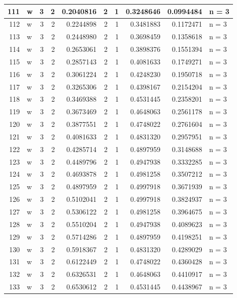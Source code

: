 \documentclass[
  letterpaper,
  DIV=11,
  numbers=noendperiod]{scrreprt}
\begin{document}
\begin{table}
\begin{tabular}[t]{r|l|r|r|r|r|r|r|r|l}
\hline
111 & w & 3 & 2 & 0.2040816 & 2 & 1 & 0.3248646 & 0.0994484 & n = 3\\
\hline
112 & w & 3 & 2 & 0.2244898 & 2 & 1 & 0.3481883 & 0.1172471 & n = 3\\
\hline
113 & w & 3 & 2 & 0.2448980 & 2 & 1 & 0.3698459 & 0.1358618 & n = 3\\
\hline
114 & w & 3 & 2 & 0.2653061 & 2 & 1 & 0.3898376 & 0.1551394 & n = 3\\
\hline
115 & w & 3 & 2 & 0.2857143 & 2 & 1 & 0.4081633 & 0.1749271 & n = 3\\
\hline
116 & w & 3 & 2 & 0.3061224 & 2 & 1 & 0.4248230 & 0.1950718 & n = 3\\
\hline
117 & w & 3 & 2 & 0.3265306 & 2 & 1 & 0.4398167 & 0.2154204 & n = 3\\
\hline
118 & w & 3 & 2 & 0.3469388 & 2 & 1 & 0.4531445 & 0.2358201 & n = 3\\
\hline
119 & w & 3 & 2 & 0.3673469 & 2 & 1 & 0.4648063 & 0.2561178 & n = 3\\
\hline
120 & w & 3 & 2 & 0.3877551 & 2 & 1 & 0.4748022 & 0.2761604 & n = 3\\
\hline
121 & w & 3 & 2 & 0.4081633 & 2 & 1 & 0.4831320 & 0.2957951 & n = 3\\
\hline
122 & w & 3 & 2 & 0.4285714 & 2 & 1 & 0.4897959 & 0.3148688 & n = 3\\
\hline
123 & w & 3 & 2 & 0.4489796 & 2 & 1 & 0.4947938 & 0.3332285 & n = 3\\
\hline
124 & w & 3 & 2 & 0.4693878 & 2 & 1 & 0.4981258 & 0.3507212 & n = 3\\
\hline
125 & w & 3 & 2 & 0.4897959 & 2 & 1 & 0.4997918 & 0.3671939 & n = 3\\
\hline
126 & w & 3 & 2 & 0.5102041 & 2 & 1 & 0.4997918 & 0.3824937 & n = 3\\
\hline
127 & w & 3 & 2 & 0.5306122 & 2 & 1 & 0.4981258 & 0.3964675 & n = 3\\
\hline
128 & w & 3 & 2 & 0.5510204 & 2 & 1 & 0.4947938 & 0.4089623 & n = 3\\
\hline
129 & w & 3 & 2 & 0.5714286 & 2 & 1 & 0.4897959 & 0.4198251 & n = 3\\
\hline
130 & w & 3 & 2 & 0.5918367 & 2 & 1 & 0.4831320 & 0.4289029 & n = 3\\
\hline
131 & w & 3 & 2 & 0.6122449 & 2 & 1 & 0.4748022 & 0.4360428 & n = 3\\
\hline
132 & w & 3 & 2 & 0.6326531 & 2 & 1 & 0.4648063 & 0.4410917 & n = 3\\
\hline
133 & w & 3 & 2 & 0.6530612 & 2 & 1 & 0.4531445 & 0.4438967 & n = 3\\

\end{tabular}
\end{table}
\end{document}
